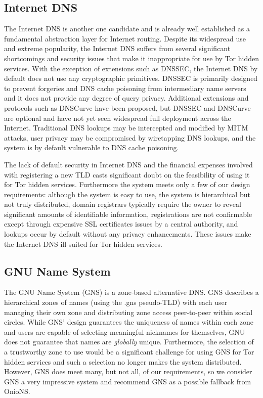 \subsection{Internet DNS}

The Internet DNS is another one candidate and is already well established as a fundamental abstraction layer for Internet routing. Despite its widespread use and extreme popularity, the Internet DNS suffers from several significant shortcomings and security issues that make it inappropriate for use by Tor hidden services. With the exception of extensions such as DNSSEC, the Internet DNS by default does not use any cryptographic primitives. DNSSEC is primarily designed to prevent forgeries and DNS cache poisoning from intermediary name servers and it does not provide any degree of query privacy\cite{wachs2014censorship}. Additional extensions and protocols such as DNSCurve\cite{bernstein2009dnscurve} have been proposed, but DNSSEC and DNSCurve are optional and have not yet seen widespread full deployment across the Internet. Traditional DNS lookups may be intercepted and modified by MITM attacks, user privacy may be compromised by wiretapping DNS lookups, and the system is by default vulnerable to DNS cache poisoning.

The lack of default security in Internet DNS and the financial expenses involved with registering a new TLD casts significant doubt on the feasibility of using it for Tor hidden services. Furthermore the system meets only a few of our design requirements: although the system is easy to use, the system is hierarchical but not truly distributed, domain registrars typically require the owner to reveal significant amounts of identifiable information, registrations are not confirmable except through expensive SSL certificates issues by a central authority, and lookups occur by default without any privacy enhancements. These issues make the Internet DNS ill-suited for Tor hidden services.

\subsection{GNU Name System}

The GNU Name System\cite{wachs2014censorship} (GNS) is a zone-based alternative DNS. GNS describes a hierarchical zones of names (using the .gns pseudo-TLD) with each user managing their own zone and distributing zone access peer-to-peer within social circles. While GNS' design guarantees the uniqueness of names within each zone and users are capable of selecting meaningful nicknames for themselves, GNU does not guarantee that names are \emph{globally} unique. Furthermore, the selection of a trustworthy zone to use would be a significant challenge for using GNS for Tor hidden services and such a selection no longer makes the system distributed. However, GNS does meet many, but not all, of our requirements, so we consider GNS a very impressive system and recommend GNS as a possible fallback from OnioNS.

